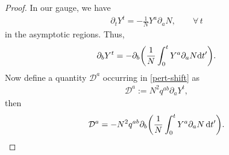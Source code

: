 \documentclass[11pt]{article}
\numberwithin{equation}{section}
\def\ptl{\partial}%
\numberwithin{equation}{section}
\begin{document}
\begin{proof}
In our gauge, we have
\begin{align*}
\ptl_t Y^t = - \frac{1}{N} Y^a\ptl_a N, \qquad \forall\, t
\end{align*}
in the asymptotic regions.
Thus,
\begin{align*}
\ptl_b Y^t = - \ptl_b \biggl(\frac{1}{N} \int^t_{0} Y^a \ptl_a N {\rm d}t' \biggr).
\end{align*}
Now define a quantity $\mathcal{D}^a $ occurring in \eqref{pert-shift} as
\begin{align*}
\mathcal{D}^a := N^2 q^{ab} \ptl_a Y^t,
\end{align*}
then
\begin{align*}
\mathcal{D}^a = - N^2 q^{ab} \ptl_b \biggl(\frac{1}{N} \int^t_{0} Y^a \ptl_a N \,{\rm d}t'\biggr).
\end{align*}


\end{proof}
\end{document}

